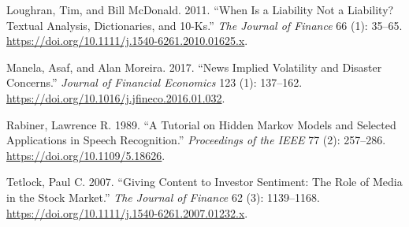 \documentclass[12pt, letterpaper]{article}
\begin{document}
\begin{description}[leftmargin=1.5em, labelwidth=0pt, itemsep=0.4em]
    \item Loughran, Tim, and Bill McDonald. 2011. ``When Is a Liability Not a Liability? Textual Analysis, Dictionaries, and 10-Ks.'' \textit{The Journal of Finance} 66 (1): 35--65. \url{https://doi.org/10.1111/j.1540-6261.2010.01625.x}.

    \item Manela, Asaf, and Alan Moreira. 2017. ``News Implied Volatility and Disaster Concerns.'' \textit{Journal of Financial Economics} 123 (1): 137--162. \url{https://doi.org/10.1016/j.jfineco.2016.01.032}.

    \item Rabiner, Lawrence R. 1989. ``A Tutorial on Hidden Markov Models and Selected Applications in Speech Recognition.'' \textit{Proceedings of the IEEE} 77 (2): 257--286. \url{https://doi.org/10.1109/5.18626}.

    \item Tetlock, Paul C. 2007. ``Giving Content to Investor Sentiment: The Role of Media in the Stock Market.'' \textit{The Journal of Finance} 62 (3): 1139--1168. \url{https://doi.org/10.1111/j.1540-6261.2007.01232.x}.
\end{description}
\end{document}
